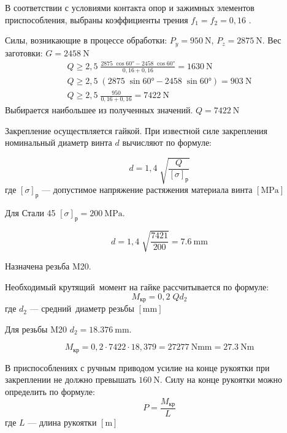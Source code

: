 \documentclass[14pt,russian,a4paper]{extreport}
\begin{document}
В соответствии с условиями контакта опор и зажимных элементов приспособления, выбраны коэффициенты трения $ f_1 = f_2 = 0,16 $ \cite[с.~85, табл.~10]{kosilova:stm2}.

Силы, возникающие в процессе обработки: $ P_y = \SI{950}{\newton} $, $ P_z = \SI{2875}{\newton} $. Вес заготовки: $ G = \SI{2458}{\newton} $
\begin{gather*}
  Q \geq 2,5 \; \frac{2875 \; \cos{\ang{60}} - 2458 \; \cos{\ang{60}}}{0,16 + 0,16} = \SI{1630}{\newton} \\
  Q \geq 2,5 \; ( 2875 \; \sin{\ang{60}} - 2458 \; \sin{\ang{60}} ) = \SI{903}{\newton} \\
  Q \geq 2,5 \; \frac{950}{0,16 + 0,16} = \SI{7422}{\newton}
\end{gather*}
Выбирается наибольшее из полученных значений. $ Q = \SI{7422}{\newton} $

Закрепление осуществляется гайкой. При известной силе закрепления номинальный диаметр винта $d$ вычисляют по формуле:

\begin{equation*}
  d = 1,4 \; \sqrt{\frac{Q}{\left[\sigma\right]_\text{р}}}
\end{equation*}
где $\left[\sigma\right]_\text{р}$ --- допустимое напряжение растяжения материала винта $\left[\si{\mega\pascal}\right]$

Для Стали 45 $ \left[\sigma\right]_\text{р} = \SI{200}{\mega\pascal} $.

\begin{equation*}
  d = 1,4 \; \sqrt{\frac{7421}{200}} = \SI{7,6}{\milli\meter}
\end{equation*}

Назначена резьба M20.

Необходимый крутящий момент на гайке рассчитывается по формуле: \cite[с.~87]{kosilova:stm2}
\begin{equation*}
  M_\text{кр} = 0,2 \; Q d_2
\end{equation*}
где $d_2$ --- средний диаметр резьбы $\left[\si{\milli\meter}\right]$

Для резьбы M20 $ d_2 = \SI{18,376}{\milli\meter} $.

\begin{equation*}
  M_\text{кр} = 0,2 \cdot 7422 \cdot 18,379 = \SI{27277}{\newton\milli\meter} = \SI{27,3}{\newton\meter}
\end{equation*}

В приспособлениях с ручным приводом усилие на конце рукоятки при закреплении не должно превышать $\SI{160}{\newton}$. Силу на конце рукоятки можно определить по формуле:
\begin{equation}
  P = \frac{M_\text{кр}}{L}
\end{equation}
где $L$ --- длина рукоятки $\left[\si{\meter}\right]$
\end{document}
